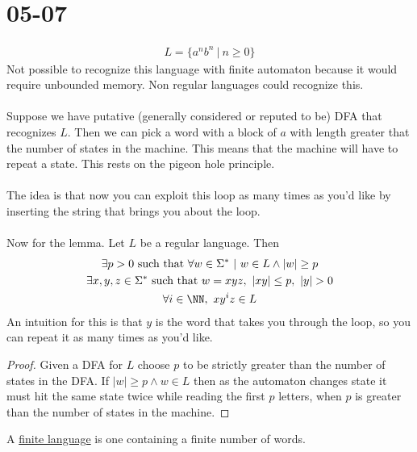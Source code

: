 \documentclass[../598comp.tex]{subfiles}
\date{05-07}
\begin{document}
\section{05-07}

\begin{lemma}
  \begin{gather*}
    L = \{a^nb^n \ | \ n \geq 0\}
  \end{gather*}
  Not possible to recognize this language with finite automaton because it would
  require unbounded memory. Non regular languages could recognize this.
  \\\\
  Suppose we have putative (generally considered or reputed to be) DFA that recognizes $L$. Then we can pick a word
  with a block of $a$ with length greater that the number of states in the
  machine. This means that the machine will have to repeat a state. This rests
  on the pigeon hole principle.
  \\\\
  The idea is that now you can exploit this loop as many times as you'd like by
  inserting the string that brings you about the loop.
  \\\\
  Now for the lemma. Let $L$ be a regular language. Then
  \begin{gather*}
    \exists p > 0 \ \text{such that} \ \forall w \in \Sigma^* \ | \ w \in L
    \wedge |w| \geq p \\
    \exists x, y, z \in \Sigma^* \ \text{such that} \ w = xyz, \ |xy| \leq p, \
    |y| > 0 \\
    \forall i \in \NN, \ xy^iz \in L
  \end{gather*}
  An intuition for this is that $y$ is the word that takes you through the loop,
  so you can repeat it as many times as you'd like.
  \begin{proof}
    Given a DFA for $L$ choose $p$ to be strictly greater than the number of
    states in the DFA. If $|w| \geq p \wedge w \in L$ then as the automaton
    changes state it must hit the same state twice while reading the first $p$
    letters, when $p$ is greater than the number of states in the machine.
  \end{proof}
\end{lemma}

\begin{definition}
  A \ul{finite language} is one containing a finite number of words.
\end{definition}
\end{document}
